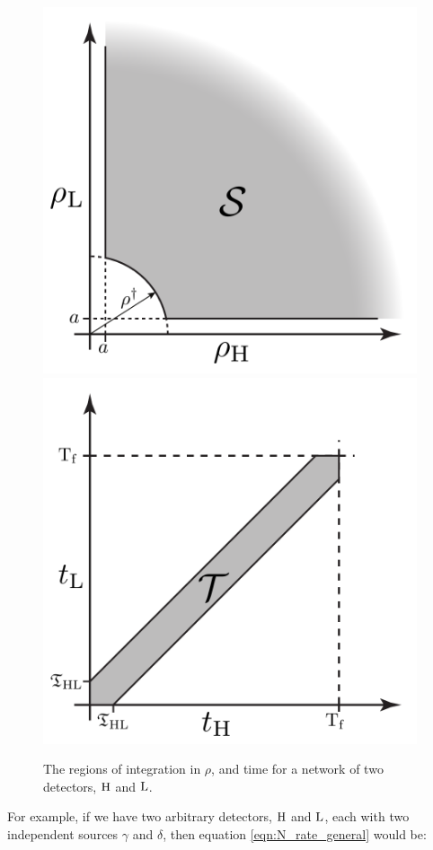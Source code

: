 \begin{figure}[p]
\label{fig:snr_time_integral}
\begin{center}
\includegraphics[height=4.25in]{figures/SNRintegrationRegion.pdf} \\
\includegraphics[height=4.25in]{figures/TimeIntegrationRegion.pdf}
\end{center}
\caption{The regions of integration in $\rho$, and time for a network of two detectors, $\mathrm{H}$ and $\mathrm{L}$.}
\end{figure}

For example, if we have two arbitrary detectors, $\mathrm{H}$ and $\mathrm{L}$, each with two independent sources $\gamma$ and $\delta$, then equation \ref{eqn:N_rate_general} would be:

